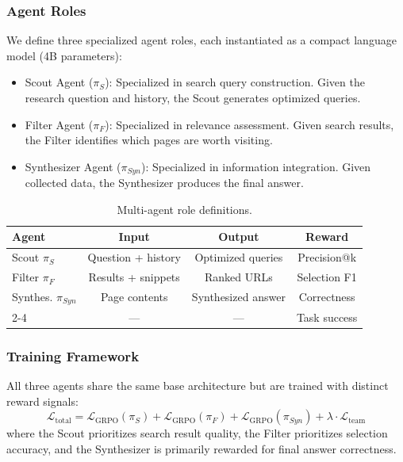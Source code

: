 \documentclass[notspecified,article,accept,pdftex,moreauthors]{Definitions/mdpi}
\renewcommand{\textbf}[1]{#1}
\begin{document}
\subsubsection{Agent Roles}
We define three specialized agent roles, each instantiated as a compact language model (4B parameters):
\begin{itemize}
    \item \textbf{Scout Agent ($\pi_S$):} Specialized in search query construction. Given the research question and history, the Scout generates optimized queries.
    \item \textbf{Filter Agent ($\pi_F$):} Specialized in relevance assessment. Given search results, the Filter identifies which pages are worth visiting.
    \item \textbf{Synthesizer Agent ($\pi_{Syn}$):} Specialized in information integration. Given collected data, the Synthesizer produces the final answer.
\end{itemize}

\begin{table}[H]
\centering
\caption{Multi-agent role definitions.}
\label{tab:roles}
\renewcommand{\arraystretch}{1.15}
\begin{tabular}{lccc}
\toprule
\textbf{Agent} & \textbf{Input} & \textbf{Output} & \textbf{Reward} \\
\midrule
Scout $\pi_S$ & Question + history & Optimized queries & Precision@k \\
Filter $\pi_F$ & Results + snippets & Ranked URLs & Selection F1 \\
Synthes. $\pi_{Syn}$ & Page contents & Synthesized answer & Correctness \\
\cmidrule{2-4}
\multicolumn{1}{l}{\textbf{Shared}} & --- & --- & Task success \\
\bottomrule
\end{tabular}
\end{table}

\subsubsection{Training Framework}
All three agents share the same base architecture but are trained with distinct reward signals:
\begin{equation}
\mathcal{L}_{\text{total}} = \mathcal{L}_{\text{GRPO}}(\pi_S) + \mathcal{L}_{\text{GRPO}}(\pi_F) + \mathcal{L}_{\text{GRPO}}(\pi_{Syn}) + \lambda \cdot \mathcal{L}_{\text{team}}
\label{eq:multi-agent-loss}
\end{equation}
where the Scout prioritizes search result quality, the Filter prioritizes selection accuracy, and the Synthesizer is primarily rewarded for final answer correctness.
\end{document}
